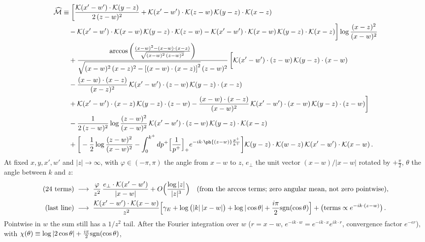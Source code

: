 \begin{align}
\widehat{\mathcal{M}}&\equiv\bigg[\frac{\mathcal{K}(x'-w')\cdot\mathcal{K}(y-z)}{2\,(z-w)^{2}}+\mathcal{K}(x'-w')\cdot\mathcal{K}(z-w)\,\mathcal{K}(y-z)\cdot\mathcal{K}(x-z)\notag\\
&\quad-\mathcal{K}(x'-w')\cdot\mathcal{K}(x-w)\,\mathcal{K}(y-z)\cdot\mathcal{K}(z-w)-\mathcal{K}(x'-w')\cdot\mathcal{K}(x-w)\,\mathcal{K}(y-z)\cdot\mathcal{K}(x-z)\bigg]\log\frac{(x-z)^{2}}{(x-w)^{2}}\notag\\
&\quad+\frac{\arccos\left(\frac{(x-w)^{2}-(x-w)\cdot (x-z)}{\sqrt{(x-w)^{2}\,(z-w)^{2}}}\right)}{\sqrt{(x-w)^{2}\,(x-z)^{2}-\left[(x-w)\cdot (x-z)\right]^{2}}\,(z-w)^{2}}\,\bigg[\mathcal{K}(x'-w')\cdot(z-w)\,\mathcal{K}(y-z)\cdot(x-w)\notag\\
&\quad-\frac{(x-w)\cdot(x-z)}{(x-z)^{2}}\,\mathcal{K}(x'-w')\cdot(z-w)\,\mathcal{K}(y-z)\cdot(x-z)\notag\\
&\quad+\mathcal{K}(x'-w')\cdot(x-z)\,\mathcal{K}(y-z)\cdot(z-w)-\frac{(x-w)\cdot(x-z)}{(x-w)^{2}}\,\mathcal{K}(x'-w')\cdot(x-w)\,\mathcal{K}(y-z)\cdot(z-w)\bigg]\notag\\
&\quad-\frac{1}{2\,(z-w)^{2}}\log\frac{(z-w)^{2}}{(x-w)^{2}}\,\mathcal{K}(x'-w')\cdot(z-w)\,\mathcal{K}(y-z)\cdot\mathcal{K}(x-z)\notag\\
&\quad+\bigg[-\frac{1}{2}\log\frac{(z-w)^{2}}{(x-w)^{2}}-\int_{0}^{k^{+}}dp^{+}\Big[\frac{1}{p^{+}}\Big]_{+}e^{-ik\cdot\ph{(z-w)}\frac{p^{+}}{k^{+}}}\bigg]\mathcal{K}(y-z)\cdot\mathcal{K}(w-z)\,\mathcal{K}(x'-w')\cdot\mathcal{K}(x-w)\,.\label{eq:C-Mhat}
\end{align}
At fixed $x,y,x',w'$ and $|z|\to\infty$, with $\varphi\in(-\pi,\pi)$ the angle from $x-w$ to $z$, $e_{\perp}$ the unit vector $(x-w)/|x-w|$ rotated by $+\frac{\pi}{2}$, $\theta$ the angle between $k$ and $z$:
\begin{align}
\text{(24 terms)}&\;\longrightarrow\;\frac{\varphi}{z^{2}}\,\frac{e_{\perp}\cdot\mathcal{K}(x'-w')}{|x-w|}+O\Big(\frac{\log|z|}{|z|^{3}}\Big)\quad\text{(from the arccos terms; zero angular mean, not zero pointwise)},\notag\\
\text{(last line)}&\;\longrightarrow\;\frac{\mathcal{K}(x'-w')\cdot\mathcal{K}(x-w)}{z^{2}}\Big[\gamma_{E}+\log\big(|k|\,|x-w|\big)+\log|\cos\theta|+\frac{i\pi}{2}{\rm sgn}(\cos\theta)\Big]+\big(\text{terms}\propto e^{-ik\cdot(z-w)}\big)\,.\notag
\end{align}
Pointwise in $w$ the sum still has a $1/z^{2}$ tail. After the Fourier integration over $w$ ($r=x-w$, $e^{-ik\cdot w}=e^{-ik\cdot x}e^{ik\cdot r}$, convergence factor $e^{-\epsilon r}$), with $\chi(\theta)\equiv\log|2\cos\theta|+\frac{i\pi}{2}{\rm sgn}(\cos\theta)$,
